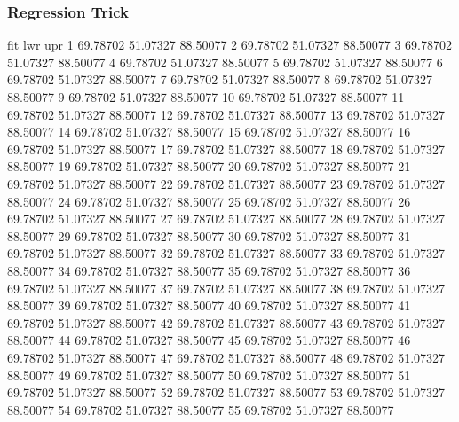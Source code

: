 \documentclass{article}
\begin{document}
\subsubsection*{Regression Trick}
\begin{Schunk}
\begin{Soutput}
        fit      lwr      upr
1  69.78702 51.07327 88.50077
2  69.78702 51.07327 88.50077
3  69.78702 51.07327 88.50077
4  69.78702 51.07327 88.50077
5  69.78702 51.07327 88.50077
6  69.78702 51.07327 88.50077
7  69.78702 51.07327 88.50077
8  69.78702 51.07327 88.50077
9  69.78702 51.07327 88.50077
10 69.78702 51.07327 88.50077
11 69.78702 51.07327 88.50077
12 69.78702 51.07327 88.50077
13 69.78702 51.07327 88.50077
14 69.78702 51.07327 88.50077
15 69.78702 51.07327 88.50077
16 69.78702 51.07327 88.50077
17 69.78702 51.07327 88.50077
18 69.78702 51.07327 88.50077
19 69.78702 51.07327 88.50077
20 69.78702 51.07327 88.50077
21 69.78702 51.07327 88.50077
22 69.78702 51.07327 88.50077
23 69.78702 51.07327 88.50077
24 69.78702 51.07327 88.50077
25 69.78702 51.07327 88.50077
26 69.78702 51.07327 88.50077
27 69.78702 51.07327 88.50077
28 69.78702 51.07327 88.50077
29 69.78702 51.07327 88.50077
30 69.78702 51.07327 88.50077
31 69.78702 51.07327 88.50077
32 69.78702 51.07327 88.50077
33 69.78702 51.07327 88.50077
34 69.78702 51.07327 88.50077
35 69.78702 51.07327 88.50077
36 69.78702 51.07327 88.50077
37 69.78702 51.07327 88.50077
38 69.78702 51.07327 88.50077
39 69.78702 51.07327 88.50077
40 69.78702 51.07327 88.50077
41 69.78702 51.07327 88.50077
42 69.78702 51.07327 88.50077
43 69.78702 51.07327 88.50077
44 69.78702 51.07327 88.50077
45 69.78702 51.07327 88.50077
46 69.78702 51.07327 88.50077
47 69.78702 51.07327 88.50077
48 69.78702 51.07327 88.50077
49 69.78702 51.07327 88.50077
50 69.78702 51.07327 88.50077
51 69.78702 51.07327 88.50077
52 69.78702 51.07327 88.50077
53 69.78702 51.07327 88.50077
54 69.78702 51.07327 88.50077
55 69.78702 51.07327 88.50077
\end{Soutput}
\end{Schunk}
\end{document}
